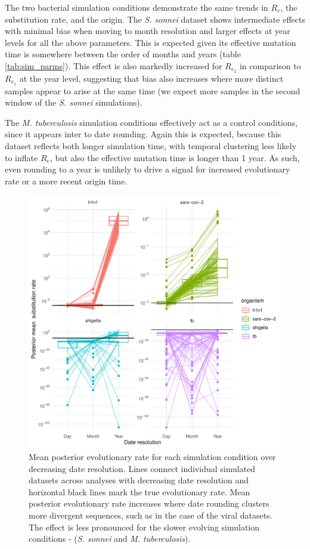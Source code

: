 \documentclass{article}
\begin{document}
\begin{spacing}{1.5}
The two bacterial simulation conditions demonstrate the same trends in $R_e$, the substitution rate, and the origin. The \textit{S. sonnei} dataset shows intermediate effects with minimal bias when moving to month resolution and larger effects at year levels for all the above parameters. This is expected given its effective mutation time is somewhere between the order of months and years (table \ref{tab:sim_parms}). This effect is also markedly increased for $R_{e_2}$ in comparison to $R_{e_1}$ at the year level, suggesting that bias also increases where more distinct samples appear to arise at the same time (we expect more samples in the second window of the \textit{S. sonnei} simulations).

The \textit{M. tuberculosis} simulation conditions effectively act as a control conditions, since it appears inter to date rounding. Again this is expected, because this dataset reflects both longer simulation time, with temporal clustering less likely to inflate $R_e$, but also the effective mutation time is longer than 1 year. As such, even rounding to a year is unlikely to drive a signal for increased evolutionary rate or a more recent origin time.

\begin{figure}
    \centering
    \includegraphics{sim_clock_trajectory.pdf}
    \caption{Mean posterior evolutionary rate for each simulation condition over decreasing date resolution. Lines connect individual simulated datasets across analyses with decreasing date resolution and horizontal black lines mark the true evolutionary rate. Mean posterior evolutionary rate increases where date rounding clusters more divergent sequences, such as in the case of the viral datasets. The effect is less pronounced for the slower evolving simulation conditions - (\textit{S. sonnei} and \textit{M. tuberculosis}).}
    \label{fig:simClock}
\end{figure}


\end{spacing}
\end{document}
